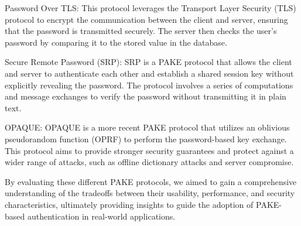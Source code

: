 \begin{newitemize}
    \item Password Over TLS: This protocol leverages the Transport Layer Security (TLS) protocol to encrypt the communication between the client and server, ensuring that the password is transmitted securely. The server then checks the user's password by comparing it to the stored value in the database.
    \item Secure Remote Password (SRP): SRP is a PAKE protocol that allows the client and server to authenticate each other and establish a shared session key without explicitly revealing the password. The protocol involves a series of computations and message exchanges to verify the password without transmitting it in plain text.
    \item OPAQUE: OPAQUE is a more recent PAKE protocol that utilizes an oblivious pseudorandom function (OPRF) to perform the password-based key exchange. This protocol aims to provide stronger security guarantees and protect against a wider range of attacks, such as offline dictionary attacks and server compromise.
\end{newitemize}

By evaluating these different PAKE protocols, we aimed to gain a comprehensive understanding of the tradeoffs between their usability, performance, and security characteristics, ultimately providing insights to guide the adoption of PAKE-based authentication in real-world applications.